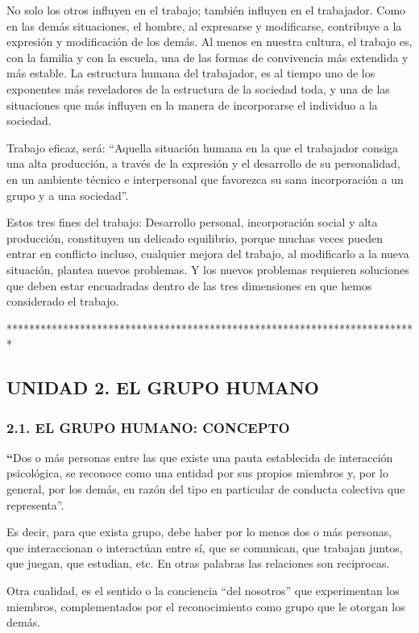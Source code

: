No solo los otros influyen en el trabajo; también influyen en el trabajador. Como en las demás situaciones, el hombre, al expresarse y modificarse, contribuye a la expresión y modificación de los demás. Al menos en nuestra cultura, el trabajo es, con la familia y con la escuela, una de las formas de convivencia más extendida y más estable. La estructura humana del trabajador, es al tiempo uno de los exponentes más reveladores de la estructura de la sociedad toda, y una de las situaciones que más influyen en la manera de incorporarse el individuo a la sociedad.

Trabajo eficaz, será: “Aquella situación humana en la que el trabajador consiga una alta producción, a través de la expresión y el desarrollo de su personalidad, en un ambiente técnico e interpersonal que favorezca su sana incorporación a un grupo y a una sociedad”.

Estos tres fines del trabajo: Desarrollo personal, incorporación social y alta producción, constituyen un delicado equilibrio, porque muchas veces pueden entrar en conflicto incluso, cualquier mejora del trabajo, al modificarlo a la nueva situación, plantea nuevos problemas. Y los nuevos problemas requieren soluciones que deben estar encuadradas dentro de las tres dimensiones en que hemos considerado el trabajo.

*************************************************************************



\subsection*{UNIDAD 2. EL GRUPO HUMANO}
\subsubsection*{2.1. EL GRUPO HUMANO: CONCEPTO}
\textbf{“}Dos o más personas entre las que existe una pauta establecida de interacción psicológica, se reconoce como una entidad por sus propios miembros y, por lo general, por los demás, en razón del tipo en particular de conducta colectiva que representa”.

Es decir, para que exista grupo, debe haber por lo menos dos o más personas, que interaccionan o interactúan entre sí, que se comunican, que trabajan juntos, que juegan, que estudian, etc. En otras palabras las relaciones son reciprocas.

Otra cualidad, es el sentido o la conciencia “del nosotros” que experimentan los miembros, complementados por el reconocimiento como grupo que le otorgan los demás.

